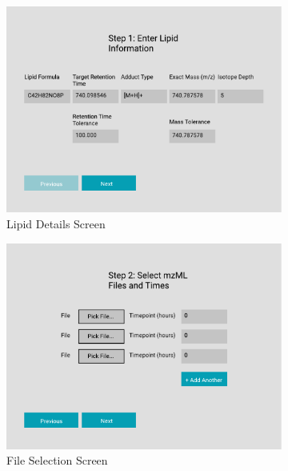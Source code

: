 \documentclass{l4proj}
\begin{document}
\begin{figure}
\centering
\begin{subfigure}{0.4\linewidth}
        \includegraphics[width=\linewidth]{dissertation/images/wireframes/wireframe1.pdf}
        \caption{Lipid Details Screen}
    \end{subfigure}
    \begin{subfigure}{0.4\linewidth}
        \includegraphics[width=\linewidth]{dissertation/images/wireframes/wireframe2.pdf}
    \caption{File Selection Screen}
    \end{subfigure}
    \begin{subfigure}{0.4\linewidth}

\end{subfigure}
\end{figure}
\end{document}
